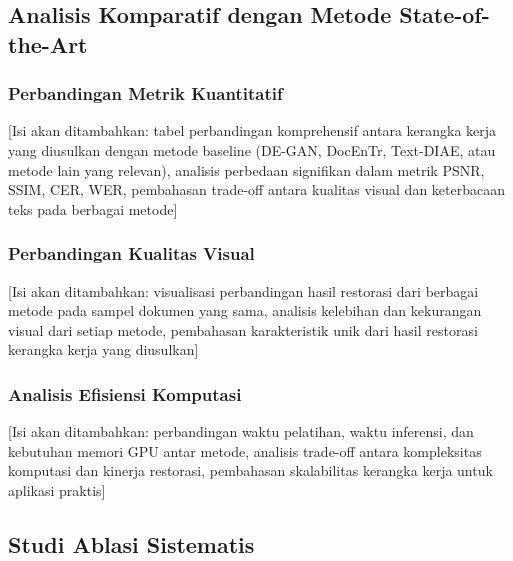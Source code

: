 \documentclass[12pt,a4paper]{article}
\begin{document}
\vspace{0.8em}

\subsection{Analisis Komparatif dengan Metode State-of-the-Art}
\label{subsec:analisis-komparatif}
\vspace{0.8em}

\subsubsection{Perbandingan Metrik Kuantitatif}
\label{subsubsec:perbandingan-metrik}

[Isi akan ditambahkan: tabel perbandingan komprehensif antara kerangka kerja yang diusulkan dengan metode baseline (DE-GAN, DocEnTr, Text-DIAE, atau metode lain yang relevan), analisis perbedaan signifikan dalam metrik PSNR, SSIM, CER, WER, pembahasan trade-off antara kualitas visual dan keterbacaan teks pada berbagai metode]

\vspace{0.8em}

\subsubsection{Perbandingan Kualitas Visual}
\label{subsubsec:perbandingan-visual}

[Isi akan ditambahkan: visualisasi perbandingan hasil restorasi dari berbagai metode pada sampel dokumen yang sama, analisis kelebihan dan kekurangan visual dari setiap metode, pembahasan karakteristik unik dari hasil restorasi kerangka kerja yang diusulkan]

\vspace{0.8em}

\subsubsection{Analisis Efisiensi Komputasi}
\label{subsubsec:efisiensi-komputasi}

[Isi akan ditambahkan: perbandingan waktu pelatihan, waktu inferensi, dan kebutuhan memori GPU antar metode, analisis trade-off antara kompleksitas komputasi dan kinerja restorasi, pembahasan skalabilitas kerangka kerja untuk aplikasi praktis]

\vspace{0.8em}

\subsection{Studi Ablasi Sistematis}
\label{subsec:studi-ablasi}
\vspace{0.8em}
\end{document}
